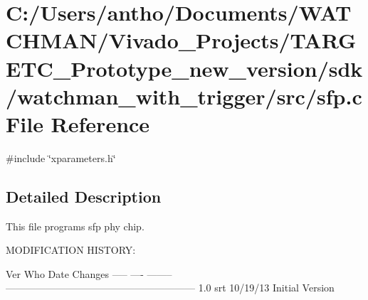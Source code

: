 \section{C\+:/\+Users/antho/\+Documents/\+W\+A\+T\+C\+H\+M\+A\+N/\+Vivado\+\_\+\+Projects/\+T\+A\+R\+G\+E\+T\+C\+\_\+\+Prototype\+\_\+new\+\_\+version/sdk/watchman\+\_\+with\+\_\+trigger/src/sfp.c File Reference}
\label{sfp_8c}
{\ttfamily \#include \char`\"{}xparameters.\+h\char`\"{}}\newline


\subsection{Detailed Description}
This file programs sfp phy chip.


\begin{DoxyPre}
MODIFICATION HISTORY:\end{DoxyPre}



\begin{DoxyPre}Ver   Who  Date  Changes
----- ---- -------- ---------------------------------------------------------
1.0   srt  10/19/13 Initial Version\end{DoxyPre}



\begin{DoxyPre}\end{DoxyPre}
 